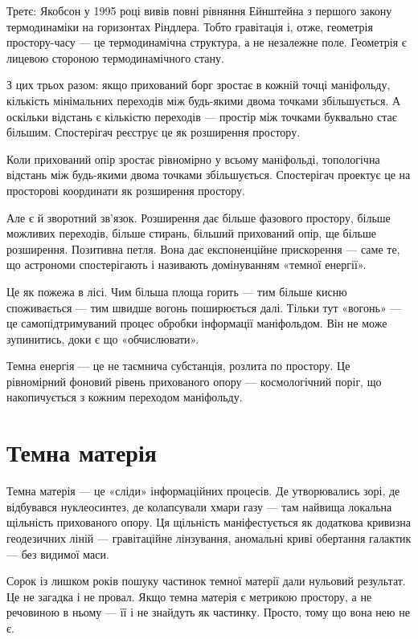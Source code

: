 \documentclass[12pt, a4paper, openany]{book}
\begin{document}
Третє: Якобсон у 1995 році вивів повні рівняння Ейнштейна з першого закону термодинаміки на горизонтах Ріндлера. Тобто гравітація і, отже, геометрія простору-часу — це термодинамічна структура, а не незалежне поле. Геометрія є лицевою стороною термодинамічного стану.

З цих трьох разом: якщо прихований борг зростає в кожній точці маніфольду, кількість мінімальних переходів між будь-якими двома точками збільшується. А оскільки відстань є кількістю переходів — простір між точками буквально стає більшим. Спостерігач реєструє це як розширення простору.

Коли прихований опір зростає рівномірно у всьому маніфольді, топологічна відстань між будь-якими двома точками збільшується. Спостерігач проектує це на просторові координати як розширення простору.

Але є й зворотний зв'язок. Розширення дає більше фазового простору, більше можливих переходів, більше стирань, більший прихований опір, ще більше розширення. Позитивна петля. Вона дає експоненційне прискорення --- саме те, що астрономи спостерігають і називають домінуванням «темної енергії».

\begin{analogybox}
Це як пожежа в лісі. Чим більша площа горить --- тим більше кисню споживається --- тим швидше вогонь поширюється далі. Тільки тут «вогонь» --- це самопідтримуваний процес обробки інформації маніфольдом. Він не може зупинитись, доки є що «обчислювати».
\end{analogybox}

Темна енергія --- це не таємнича субстанція, розлита по простору. Це рівномірний фоновий рівень прихованого опору --- космологічний поріг, що накопичується з кожним переходом маніфольду.

\section{Темна матерія}

Темна матерія --- це «сліди» інформаційних процесів. Де утворювались зорі, де відбувався нуклеосинтез, де колапсували хмари газу --- там найвища локальна щільність прихованого опору. Ця щільність маніфестується як додаткова кривизна геодезичних ліній --- гравітаційне лінзування, аномальні криві обертання галактик --- без видимої маси.

Сорок із лишком років пошуку частинок темної матерії дали нульовий результат. Це не загадка і не провал. Якщо темна матерія є метрикою простору, а не речовиною в ньому --- її і не знайдуть як частинку. Просто, тому що вона нею не є.
\end{document}

